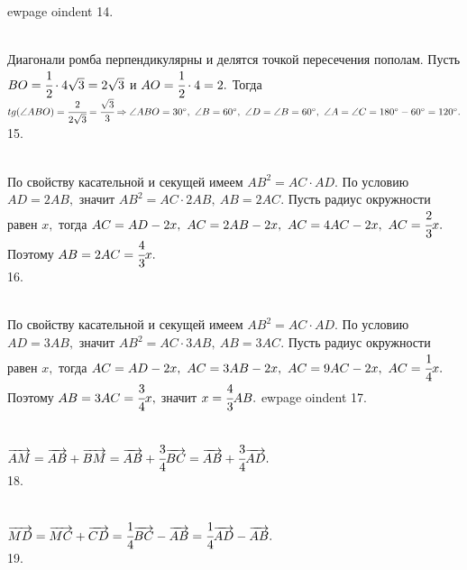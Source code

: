 ewpage
oindent
14. \begin{figure}[ht!]
\end{figure}\\
Диагонали ромба перпендикулярны и делятся точкой пересечения пополам. Пусть $BO=\cfrac{1}{2}\cdot4\sqrt{3}=2\sqrt{3}$ и $AO=\cfrac{1}{2}\cdot4=2.$ Тогда $tg(\angle ABO)=\cfrac{2}{2\sqrt{3}}=\cfrac{\sqrt{3}}{3}\Rightarrow \angle ABO =30^\circ,\ \angle B=60^\circ,\ \angle D=\angle B=60^\circ,\ \angle A=\angle C=180^\circ-60^\circ=120^\circ.$\\
15. \begin{figure}[ht!]
\end{figure}\\
По свойству касательной и секущей имеем $AB^2=AC\cdot AD.$ По условию $AD=2AB,$ значит $AB^2=AC\cdot2AB,\ AB=2AC.$ Пусть радиус окружности равен $x,$ тогда $AC=AD-2x,\ AC=2AB-2x,\ AC=4AC-2x,\ AC=\cfrac{2}{3}x.$ Поэтому $AB=2AC=\cfrac{4}{3}x.$\\
16. \begin{figure}[ht!]
\end{figure}\\
По свойству касательной и секущей имеем $AB^2=AC\cdot AD.$ По условию $AD=3AB,$ значит $AB^2=AC\cdot3AB,\ AB=3AC.$ Пусть радиус окружности равен $x,$ тогда $AC=AD-2x,\ AC=3AB-2x,\ AC=9AC-2x,\ AC=\cfrac{1}{4}x.$ Поэтому $AB=3AC=\cfrac{3}{4}x,$ значит $x=\cfrac{4}{3}AB.$
ewpage
oindent
17. \begin{figure}[ht!]
\end{figure}\\
$\overrightarrow{AM}=\overrightarrow{AB}+\overrightarrow{BM}=\overrightarrow{AB}+\cfrac{3}{4}\overrightarrow{BC}=
\overrightarrow{AB}+\cfrac{3}{4}\overrightarrow{AD}.$\\
18. \begin{figure}[ht!]
\end{figure}\\
$\overrightarrow{MD}=\overrightarrow{MC}+\overrightarrow{CD}=\cfrac{1}{4}\overrightarrow{BC}-\overrightarrow{AB}=
\cfrac{1}{4}\overrightarrow{AD}-\overrightarrow{AB}.$\\
19. \begin{figure}[ht!]
\end{figure}\\
